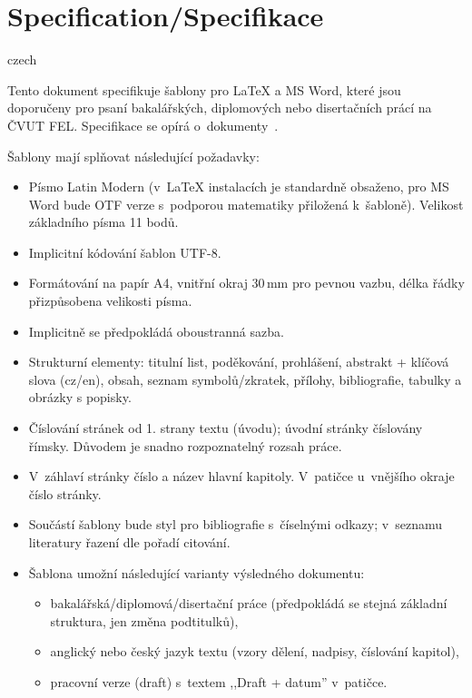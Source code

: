 %

\chapter{Specification/Specifikace}
\label{app:specif}
\begin{otherlanguage*}{czech}

Tento dokument specifikuje šablony pro \LaTeX{} a MS Word, které jsou
doporučeny pro psaní bakalářských, diplomových nebo disertačních prácí
na ČVUT FEL. Specifikace se opírá
o~dokumenty~\cite{CVUT_FEL:zaverecne_prace, CVUT_FEL:smernice, CSN:016910}.

\hbox{}

\noindent
Šablony mají splňovat následující požadavky:
\begin{itemize}
\item Písmo Latin Modern (v~\LaTeX{} instalacích je standardně
  obsaženo, pro MS Word bude OTF verze s~podporou matematiky přiložená
  k~šabloně). Velikost základního písma 11 bodů.
\item Implicitní kódování šablon UTF-8.
\item Formátování na papír A4, vnitřní okraj 30\,mm pro pevnou
  vazbu, délka řádky přizpůsobena velikosti písma.
\item Implicitně se předpokládá oboustranná sazba.
\item Strukturní elementy: titulní list, poděkování, prohlášení,
  abstrakt + klíčová slova (cz/en), obsah, seznam symbolů/zkratek,
  přílohy, bibliografie, tabulky a obrázky s popisky.
\item Číslování stránek od 1. strany textu (úvodu); úvodní stránky
  číslovány římsky. Důvodem je snadno rozpoznatelný rozsah práce.
\item V~záhlaví stránky číslo a název hlavní kapitoly. V~patičce
  u~vnějšího okraje číslo stránky.
\item Součástí šablony bude styl pro bibliografie s~číselnými odkazy;
  v~seznamu literatury řazení dle pořadí citování.
\item Šablona umožní následující varianty výsledného dokumentu:
  \begin{itemize}
    \item bakalářská/diplomová/disertační práce (předpokládá se stejná
      základní struktura, jen změna podtitulků),
    \item anglický nebo český jazyk textu (vzory dělení, nadpisy,
      číslování kapitol),
    \item pracovní verze (draft) s~textem ,,Draft +
      datum'' v~patičce.
  \end{itemize}
\end{itemize}

\end{otherlanguage*}

\endinput

